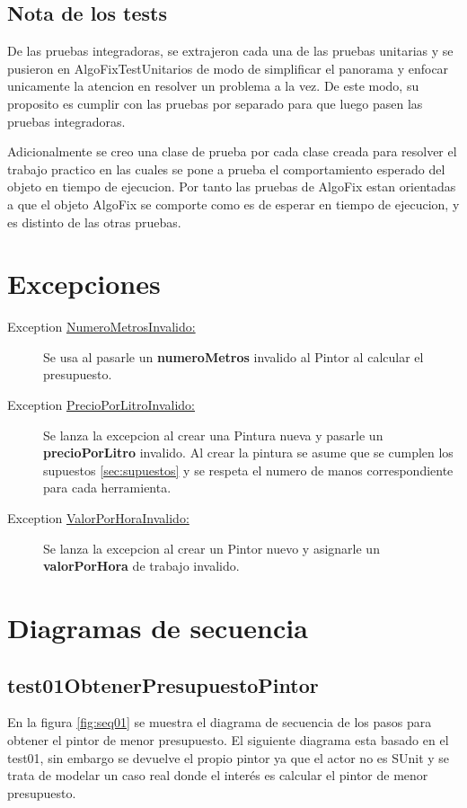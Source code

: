 \documentclass[titlepage,a4paper]{article}
\begin{document}
\subsection{Nota de los tests}
De las pruebas integradoras, se extrajeron cada una de las pruebas unitarias y se pusieron en AlgoFixTestUnitarios 
de modo de simplificar el panorama y enfocar unicamente la atencion en resolver un problema a la vez. 
De este modo, su proposito es cumplir con las pruebas por separado para que luego pasen las pruebas integradoras. \newline

Adicionalmente se creo una clase de prueba por cada clase creada para resolver el trabajo practico
en las cuales se pone a prueba el comportamiento esperado del objeto en tiempo de ejecucion. Por tanto
las pruebas de AlgoFix estan orientadas a que el objeto AlgoFix se comporte como es de esperar en tiempo de ejecucion, 
y es distinto de las otras pruebas.


\section{Excepciones}\label{sec:excepciones}
\begin{description}
\item[Exception \underline{NumeroMetrosInvalido:}] Se usa al pasarle un \textbf{numeroMetros} invalido al Pintor al calcular el presupuesto.
\item[Exception \underline{PrecioPorLitroInvalido:}] Se lanza la excepcion al crear una Pintura nueva y pasarle un \textbf{precioPorLitro} invalido.
 Al crear la pintura se asume que se cumplen los supuestos \ref{sec:supuestos} y se respeta el numero de manos correspondiente para cada herramienta.
\item[Exception \underline{ValorPorHoraInvalido:}] Se lanza la excepcion al crear un Pintor nuevo y asignarle un \textbf{valorPorHora} de trabajo invalido.
\end{description}

\section{Diagramas de secuencia}\label{sec:diagramasdesecuencia}

\subsection{test01ObtenerPresupuestoPintor}
En la figura \ref{fig:seq01} se muestra el diagrama de secuencia de los pasos para obtener el pintor de menor presupuesto.
El siguiente diagrama esta basado en el test01, sin embargo se devuelve el propio pintor ya que el actor no es SUnit y se 
trata de modelar un caso real donde el interés es calcular el pintor de menor presupuesto.
\end{document}
